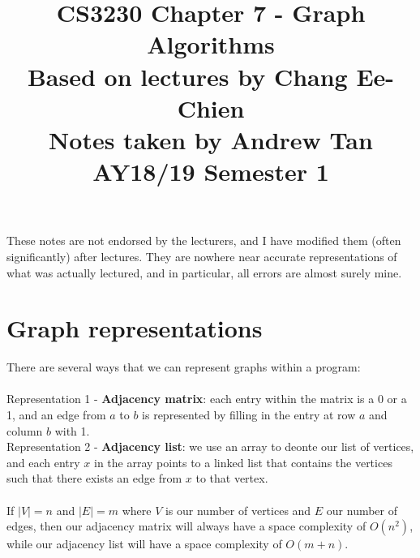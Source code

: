 \documentclass[a4paper]{article}
\title{%
	CS3230 Chapter 7 - Graph Algorithms \\
	\large Based on lectures by Chang Ee-Chien
	\\ Notes taken by Andrew Tan
	\\ AY18/19 Semester 1
	\\ }
\author{}
\date{\vspace{-5ex}}
\begin{document}
\maketitle

\begin{center}\begin{minipage}[c]{0.9\textwidth}\centering\footnotesize These notes are not endorsed by the lecturers, and I have modified them (often significantly) after lectures. They are nowhere near accurate representations of what was actually lectured, and in particular, all errors are almost surely mine.\end{minipage}\end{center}

\section{Graph representations}
There are several ways that we can represent graphs within a program:\\\\
Representation 1 - \textbf{Adjacency matrix}: each entry within the matrix is a 0 or a 1, and an edge from $a$ to $b$ is represented by filling in the entry at row $a$ and column $b$ with 1.\\
Representation 2 - \textbf{Adjacency list}: we use an array to deonte our list of vertices, and each entry $x$ in the array points to a linked list that contains the vertices such that there exists an edge from $x$ to that vertex.\\\\
If $|V| = n$ and $|E| = m$ where $V$ is our number of vertices and $E$ our number of edges, then our adjacency matrix will always have a space complexity of $O(n^2)$, while our adjacency list will have a space complexity of $O(m+n)$.
\end{document}
